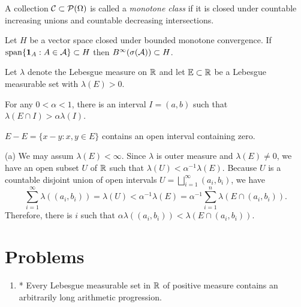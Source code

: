 \documentclass{../../large}
\begin{document}
\begin{prb}
A collection $\mathcal{C}\subset\mathcal{P}(\Omega)$ is called a \emph{monotone class} if it is closed under countable increasing unions and countable decreasing intersections.

Let $H$ be a vector space closed under bounded monotone convergence.
If $\operatorname{span}\{\mathbf{1}_A:A\in\mathcal{A}\}\subset H$ then $B^\infty(\sigma(\mathcal{A}))\subset H$.
\end{prb}



\begin{prb}
Let $\lambda$ denote the Lebesgue measure on $\mathbb{R}$ and let $\mathbb{E}\subset\mathbb{R}$ be a Lebesgue measurable set with $\lambda(E)>0$.
\begin{parts}
\item For any $0<\alpha<1$, there is an interval $I=(a,b)$ such that $\lambda(E\cap I)>\alpha\lambda(I)$.
\item $E-E=\{x-y:x,y\in E\}$ contains an open interval containing zero.
\end{parts}
\begin{pf}
(a)
We may assum $\lambda(E)<\infty$.
Since $\lambda$ is outer measure and $\lambda(E)\ne0$, we have an open subset $U$ of $\mathbb{R}$ such that $\lambda(U)<\alpha^{-1}\lambda(E)$.
Because $U$ is a countable disjoint union of open intervals $U=\bigsqcup_{i=1}^\infty(a_i,b_i)$, we have
\[\sum_{i=1}^\infty\lambda((a_i,b_i))=\lambda(U)<\alpha^{-1}\lambda(E)=\alpha^{-1}\sum_{i=1}^n\lambda(E\cap(a_i,b_i)).\]
Therefore, there is $i$ such that $\alpha\lambda((a_i,b_i))<\lambda(E\cap(a_i,b_i))$.
\end{pf}
\end{prb}




\section*{Problems}
\begin{enumerate}
\item* Every Lebesgue measurable set in $\mathbb{R}$ of positive measure contains an arbitrarily long arithmetic progression.
\end{enumerate}
\end{document}
